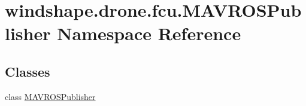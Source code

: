 \hypertarget{namespacewindshape_1_1drone_1_1fcu_1_1_m_a_v_r_o_s_publisher}{}\section{windshape.\+drone.\+fcu.\+M\+A\+V\+R\+O\+S\+Publisher Namespace Reference}
\label{namespacewindshape_1_1drone_1_1fcu_1_1_m_a_v_r_o_s_publisher}
\subsection*{Classes}
\begin{DoxyCompactItemize}
\item 
class \mbox{\hyperlink{classwindshape_1_1drone_1_1fcu_1_1_m_a_v_r_o_s_publisher_1_1_m_a_v_r_o_s_publisher}{M\+A\+V\+R\+O\+S\+Publisher}}
\end{DoxyCompactItemize}

